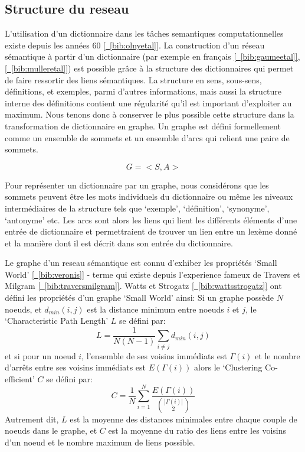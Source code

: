 \subsection{Structure du reseau}

L'utilisation d'un dictionnaire dans les tâches semantiques computationnelles
existe depuis les années 60 \hyperref[bib:olnyetal]{[~\ref*{bib:olnyetal}]}.
La construction d'un réseau sémantique à partir d'un dictionnaire (par exemple
en français \hyperref[bib:gaumeetal]{[~\ref*{bib:gaumeetal}]},
\hyperref[bib:mulleretal]{[~\ref*{bib:mulleretal}]}) est possible 
grâce à la structure des dictionnaires qui permet de faire ressortir des liens 
sémantiques. La structure en sens, sous-sens, définitions, et exemples, parmi 
d'autres informations, mais aussi la structure interne des définitions contient 
une régularité qu'il est important d'exploiter au maximum. Nous tenons donc à 
conserver le plus possible cette structure dans la transformation de dictionnaire 
en graphe. Un graphe est défini formellement comme un ensemble de sommets et un 
ensemble d'arcs qui relient une paire de sommets.

\[
G = <S, A>
\]

Pour représenter un dictionnaire par un graphe, nous considérons que les 
sommets peuvent être les mots individuels du dictionnaire ou même les niveaux 
intermédiaires de la structure tels que `exemple', `définition', `synonyme', 
`antonyme' etc. Les arcs sont alors les liens qui lient les différents éléments 
d'une entrée de dictionnaire et permettraient de trouver un lien entre un 
lexème donné et la manière dont il est décrit dans son entrée du dictionnaire.

Le graphe d'un reseau sémantique est connu d'exhiber les propriétés `Small World'
\hyperref[bib:veronis]{[~\ref*{bib:veronis}]} -
terme qui existe depuis l'experience fameux de Travers et Milgram
\hyperref[bib:traversmilgram]{[~\ref*{bib:traversmilgram}]}.
Watts et Strogatz \hyperref[bib:wattsstrogatz]{[~\ref*{bib:wattsstrogatz}]}
ont défini les propriétés d'un graphe `Small World' ainsi:
Si un graphe possède $N$ noeuds, et $d_{min}(i,j)$ est la distance minimum
entre noeuds $i$ et $j$, le `Characteristic Path Length' $L$ se défini par:
$$L = \frac{1}{N(N-1)} \sum\limits_{i\ne j} d_{min}(i,j) $$
et si pour un noeud $i$, l'ensemble de ses voisins immédiats est $\Gamma (i)$
et le nombre d'arrêts entre ses voisins immédiats est $E(\Gamma (i))$
alors le `Clustering Co-efficient' $C$ se défini par:
$$C = \frac{1}{N}\sum\limits_{i=1}^N \frac{E(\Gamma (i))}{\binom{|\Gamma (i)|}{2}} $$
Autrement dit, $L$ est la moyenne des distances minimales entre chaque couple
de noeuds dans le graphe, et $C$ est la moyenne du ratio des liens entre les voisins d'un
noeud et le nombre maximum de liens possible.

